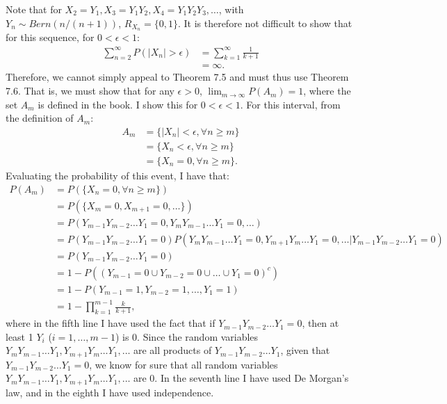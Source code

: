 \begin{problem}{20}  Note that for $X_2 = Y_1, X_3=Y_1Y_2, X_4 = Y_1Y_2Y_3, \ldots$, with $Y_n \sim Bern(n/(n+1))$, $R_{X_n} = \{0,1\}$.  It is therefore not difficult to show that for this sequence, for $0<\epsilon <1$:
\begin{align*}
\sum_{n=2}^\infty P(|X_n|>\epsilon) &= \sum_{k=1}^\infty \frac{1}{k+1} \\
& = \infty.
\end{align*}
Therefore, we cannot simply appeal to Theorem 7.5 and must thus use Theorem 7.6.  That is, we must show that for any $\epsilon>0$, $\lim_{m \rightarrow \infty}P(A_m)=1$, where the set $A_m$ is defined in the book.  I show this for $0<\epsilon <1$.  For this interval, from the definition of $A_m$:
\begin{align*}
A_m &= \{|X_n|<\epsilon, \forall n \ge m \} \\
&= \{X_n<\epsilon, \forall n \ge m \} \\
&= \{X_n=0, \forall n \ge m \}.
\end{align*}
Evaluating the probability of this event, I have that:
\begin{align*}
P(A_m) &= P(\{X_n=0, \forall n \ge m \})\\
&= P(\{X_m=0, X_{m+1}=0, \ldots \})\\
&=P(Y_{m-1}Y_{m-2}\ldots Y_1 = 0, Y_{m}Y_{m-1}\ldots Y_1 = 0, \ldots)\\
&=P(Y_{m-1}Y_{m-2}\ldots Y_1 = 0)P(Y_{m}Y_{m-1}\ldots Y_1 = 0, Y_{m+1}Y_{m}\ldots Y_1 = 0, \ldots|Y_{m-1}Y_{m-2}\ldots Y_1 = 0) \\
&=P(Y_{m-1}Y_{m-2}\ldots Y_1 = 0) \\
& = 1-P\left( \left( Y_{m-1}=0 \cup Y_{m-2}=0 \cup \ldots \cup Y_{1}=0 \right)^c \right) \\
& = 1-P\left(Y_{m-1}=1, Y_{m-2}=1, \ldots, Y_{1}=1 \right) \\
& = 1-\prod_{k=1}^{m-1}\frac{k}{k+1},
\end{align*}
where in the fifth line I have used the fact that if $Y_{m-1}Y_{m-2}\ldots Y_1 = 0$, then at least 1 $Y_i$ ($i =1, \ldots, m-1$) is 0.  Since the random variables $Y_{m}Y_{m-1}\ldots Y_1, Y_{m+1}Y_{m}\ldots Y_1, \ldots$ are all products of $Y_{m-1}Y_{m-2}\ldots Y_1$, given that $Y_{m-1}Y_{m-2}\ldots Y_1 = 0$, we know for sure that all random variables $Y_{m}Y_{m-1}\ldots Y_1, Y_{m+1}Y_{m}\ldots Y_1, \ldots$ are 0.  In the seventh line I have used De Morgan's law, and in the eighth I have used independence.  


\end{problem}
